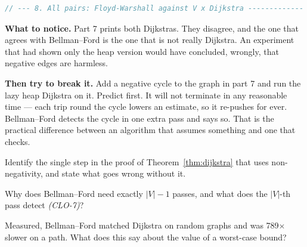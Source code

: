\begin{lab}
\begin{lstlisting}[language=C++]
// --- 8. All pairs: Floyd-Warshall against V x Dijkstra -------------
\end{lstlisting}

\textbf{What to notice.} Part 7 prints both Dijkstras. They disagree, and the
one that agrees with Bellman--Ford is the one that is not really Dijkstra. An
experiment that had shown only the heap version would have concluded, wrongly,
that negative edges are harmless.

\smallskip
\textbf{Then try to break it.} Add a negative cycle to the graph in part 7 and
run the lazy heap Dijkstra on it. Predict first. It will not terminate in any
reasonable time --- each trip round the cycle lowers an estimate, so it
re-pushes for ever. Bellman--Ford detects the cycle in one extra pass and says
so. That is the practical difference between an algorithm that assumes
something and one that checks.
\end{lab}

\begin{checkpoint}
\begin{tightnum}
  \item Identify the single step in the proof of Theorem~\ref{thm:dijkstra}
        that uses non-negativity, and state what goes wrong without it.
  \item Why does Bellman--Ford need exactly $|V|-1$ passes, and what does the
        $|V|$-th pass detect \emph{(CLO-7)}?
  \item Measured, Bellman--Ford matched Dijkstra on random graphs and was
        789$\times$ slower on a path. What does this say about the value of a
        worst-case bound?
\end{tightnum}
\end{checkpoint}

